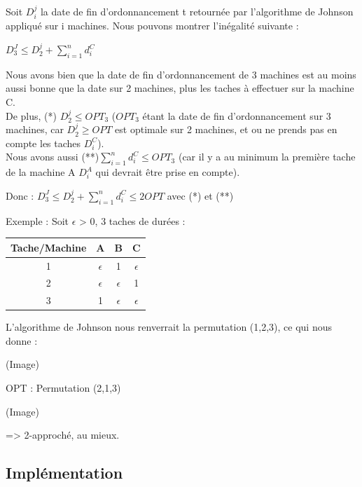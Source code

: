 \documentclass[12pt]{article}
\begin{document}
Soit $D_i^j$ la date de fin d'ordonnancement t retournée par l'algorithme de Johnson appliqué sur i machines.
Nous pouvons montrer l'inégalité suivante : \\
\begin{center}
$D_3^J \le D_2^j + \displaystyle\sum_{i=1}^n d_i^C$\\
\end{center}
Nous avons bien que la date de fin d'ordonnancement de 3 machines est au moins aussi bonne que la date sur 2 machines, plus les taches à effectuer sur la machine C.\\

De plus, (*) $D_2^j \le OPT_3$ ($OPT_3$ étant la date de fin d'ordonnancement sur 3 machines, car $D_2^j \ge OPT$ est optimale sur 2 machines, et ou ne prends pas en compte les taches $D_i^C$).\\

Nous avons aussi (**)$\displaystyle\sum_{i=1}^n d_i^C \le OPT_3$ (car il y a au minimum la première tache de la machine A $D_i^A$ qui devrait être prise en compte).\\
\begin{center}
Donc :
$D_3^J \le D_2^j + \displaystyle\sum_{i=1}^n d_i^C \le 2OPT$ avec (*) et (**)
\end{center}
Exemple : Soit $\epsilon$ > 0, 3 taches de durées :\\
\begin{center}
\begin{tabular}{|c|c|c|c|}

\hline 
Tache/Machine & A & B & C \\ 
\hline 
1 & $\epsilon$ & 1 & $\epsilon$ \\ 
\hline 
2 & $\epsilon$ & $\epsilon$ & 1 \\ 
\hline 
3 & 1 & $\epsilon$ & $\epsilon$ \\ 
\hline 
\end{tabular} 
\end{center}
L'algorithme de Johnson nous renverrait la permutation (1,2,3), ce qui nous donne :

(Image)

OPT : Permutation (2,1,3)

(Image)

=> 2-approché, au mieux.

\subsection{Implémentation}
\end{document}
